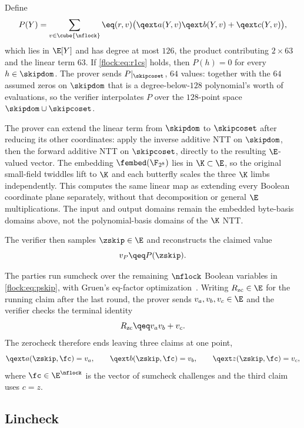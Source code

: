 Define
\begin{equation}\label{flock:eq:pskip}
P(Y)=\sum_{v\in\cube{\nflock}}\eq(r,v)\bigl(\qext a(Y,v)\qext b(Y,v)+\qext c(Y,v)\bigr),
\end{equation}
which lies in $\E[Y]$ and has degree at most $126$, the product contributing $2\times 63$ and the linear term $63$. If \eqref{flock:eq:r1cs} holds, then $P(h)=0$ for every $h\in\skipdom$. The prover sends $P|_{\skipcoset}$, $64$ values: together with the $64$ assumed zeros on $\skipdom$ that is a degree-below-$128$ polynomial's worth of evaluations, so the verifier interpolates $P$ over the $128$-point space $\skipdom\cup\skipcoset$.

The prover can extend the linear term from $\skipdom$ to $\skipcoset$ after reducing its other coordinates: apply the inverse additive NTT on $\skipdom$, then the forward additive NTT on $\skipcoset$, directly to the resulting $\E$-valued vector. The embedding $\fembed(\F_{2^8})$ lies in $\K\subset\E$, so the original small-field twiddles lift to $\K$ and each butterfly scales the three $\K$ limbs independently. This computes the same linear map as extending every Boolean coordinate plane separately, without that decomposition or general $\E$ multiplications. The input and output domains remain the embedded byte-basis domains above, not the polynomial-basis domains of the $\K$ NTT.

The verifier then samples $\zskip\in\E$ and reconstructs the claimed value
\[
v_P \qeq P(\zskip).
\]

The parties run sumcheck over the remaining $\nflock$ Boolean variables in \eqref{flock:eq:pskip}, with Gruen's eq-factor optimization~\cite{Gru24}. Writing $R_{\mathrm{zc}}\in\E$ for the running claim after the last round, the prover sends $v_a,v_b,v_c\in\E$ and the verifier checks the terminal identity
\begin{equation}\label{flock:eq:zc-terminal}
R_{\mathrm{zc}}\qeq v_av_b+v_c.
\end{equation}
The zerocheck therefore ends leaving three claims at one point,
\begin{equation}\label{flock:eq:zc-claims}
\qext a(\zskip,\fc)=v_a,\qquad \qext b(\zskip,\fc)=v_b,\qquad \qext z(\zskip,\fc)=v_c,
\end{equation}
where $\fc\in\E^{\nflock}$ is the vector of sumcheck challenges and the third claim uses $c=z$.

\subsection{Lincheck}\label{flock:lincheck}

